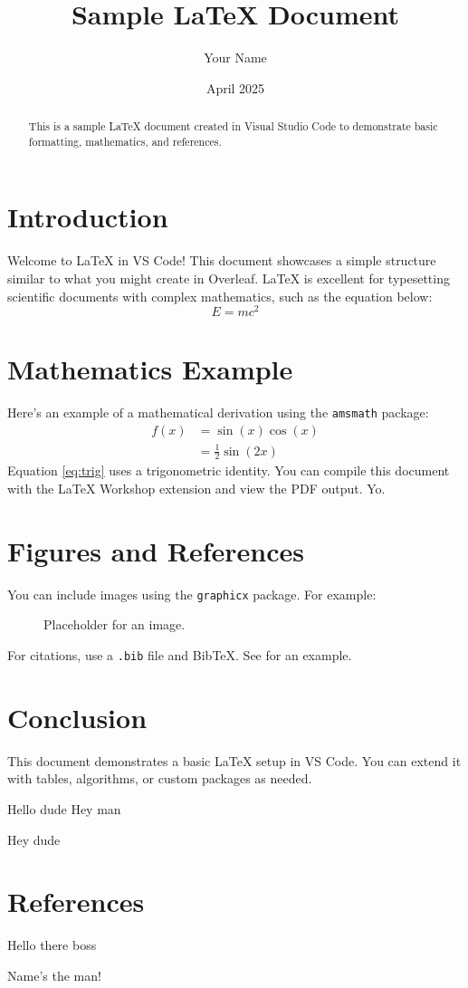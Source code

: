 \documentclass[12pt]{article}
\title{Sample LaTeX Document}
\author{Your Name}
\date{April 2025}
\begin{document}
\maketitle

\begin{abstract}
This is a sample LaTeX document created in Visual Studio Code to demonstrate basic formatting, mathematics, and references.
\end{abstract} 

\section{Introduction}
Welcome to LaTeX in VS Code! This document showcases a simple structure similar to what you might create in Overleaf. LaTeX is excellent for typesetting scientific documents with complex mathematics, such as the equation below:
\begin{equation} 
E = mc^2
\end{equation}

\section{Mathematics Example}
Here’s an example of a mathematical derivation using the \texttt{amsmath} package:
\begin{align}
f(x) &= \sin(x) \cos(x) \\
     &= \frac{1}{2} \sin(2x) \label{eq:trig}
\end{align}
Equation \eqref{eq:trig} uses a trigonometric identity. You can compile this document with the LaTeX Workshop extension and view the PDF output. Yo. 

\section{Figures and References}
You can include images using the \texttt{graphicx} package. For example:
\begin{figure}[h]
    \centering
    \caption{Placeholder for an image.}
    \label{fig:example}
\end{figure}

For citations, use a \texttt{.bib} file and BibTeX. See \cite{knuth1997art} for an example.

\section{Conclusion}
This document demonstrates a basic LaTeX setup in VS Code. You can extend it with tables, algorithms, or custom packages as needed.

Hello dude Hey man 

Hey dude 





\section{References}

Hello there boss

Name's the man!
\end{document}
